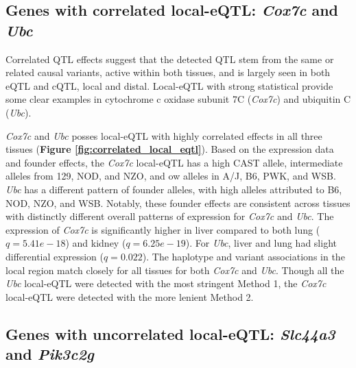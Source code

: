 \subsection{Genes with correlated local-eQTL: \textit{Cox7c} and \textit{Ubc}}

Correlated QTL effects suggest that the detected QTL stem from the same or related causal variants, active within both tissues, and is largely seen in both eQTL and cQTL, local and distal. Local-eQTL with strong statistical provide some clear examples in cytochrome c oxidase subunit 7C (\textit{Cox7c}) and ubiquitin C (\textit{Ubc}).

\textit{Cox7c} and \textit{Ubc} posses local-eQTL with highly correlated effects in all three tissues (\textbf{Figure \ref{fig:correlated_local_eqtl}}). Based on the expression data and founder effects, the \textit{Cox7c} local-eQTL has a high CAST allele, intermediate alleles from 129, NOD, and NZO, and ow alleles in A/J, B6, PWK, and WSB. \textit{Ubc} has a different pattern of founder alleles, with high alleles attributed to B6, NOD, NZO, and WSB. Notably, these founder effects are consistent across tissues with distinctly different overall patterns of expression for \textit{Cox7c} and \textit{Ubc}. The expression of \textit{Cox7c} is significantly higher in liver compared to both lung ($q = 5.41e-18$) and kidney ($q = 6.25e-19$). For \textit{Ubc}, liver and lung had slight differential expression ($q = 0.022$). The haplotype and variant associations in the local region match closely for all tissues for both \textit{Cox7c} and \textit{Ubc}. Though all the \textit{Ubc} local-eQTL were detected with the most stringent Method 1, the \textit{Cox7c} local-eQTL were detected with the more lenient Method 2.

\subsection{Genes with uncorrelated local-eQTL: \textit{Slc44a3} and \textit{Pik3c2g}}


